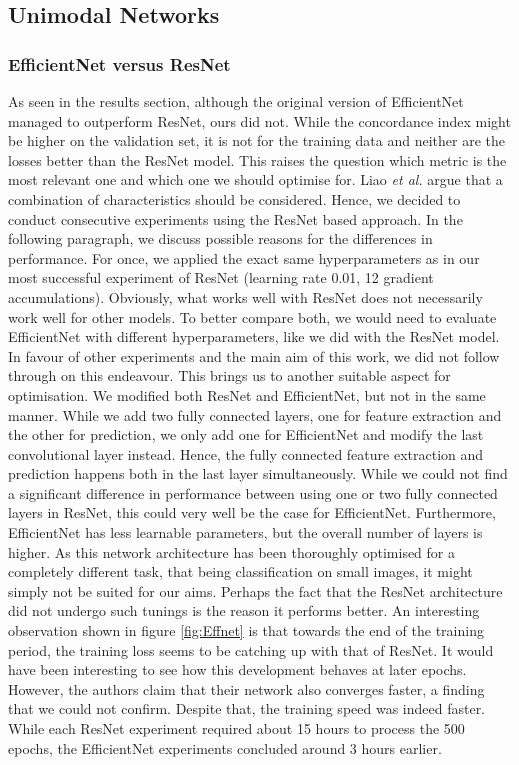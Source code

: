 \subsection{Unimodal Networks}

\subsubsection{EfficientNet versus ResNet} As seen in the results section, although the original version of EfficientNet managed to outperform ResNet, ours did not. While the concordance index might be higher on the validation set, it is not for the training data and neither are the losses better than the ResNet model. This raises the question which metric is the most relevant one and which one we should optimise for. Liao \textit{et al.} argue that a combination of characteristics should be considered. \cite{Liao2022Empirical} Hence, we decided to conduct consecutive experiments using the ResNet based approach. In the following paragraph, we discuss possible reasons for the differences in performance.
For once, we applied the exact same hyperparameters as in our most successful experiment of ResNet (learning rate 0.01, 12 gradient accumulations). Obviously, what works well with ResNet does not necessarily work well for other models. To better compare both, we would need to evaluate EfficientNet with different hyperparameters, like we did with the ResNet model. In favour of other experiments and the main aim of this work, we did not follow through on this endeavour. 
This brings us to another suitable aspect for optimisation. We modified both ResNet and EfficientNet, but not in the same manner. While we add two fully connected layers, one for feature extraction and the other for prediction, we only add one for EfficientNet and modify the last convolutional layer instead. Hence, the fully connected feature extraction and prediction happens both in the last layer simultaneously. While we could not find a significant difference in performance between using one or two fully connected layers in ResNet, this could very well be the case for EfficientNet. Furthermore, EfficientNet has less learnable parameters, but the overall number of layers is higher. As this network architecture has been thoroughly optimised for a completely different task, that being classification on small images, it might simply not be suited for our aims. Perhaps the fact that the ResNet architecture did not undergo such tunings is the reason it performs better. An interesting observation shown in figure \ref{fig:Effnet} is that towards the end of the training period, the training loss seems to be catching up with that of ResNet. It would have been interesting to see how this development behaves at later epochs. However, the authors claim that their network also converges faster, \cite{Tan2021EfficientNetV2} a finding that we could not confirm. Despite that, the training speed was indeed faster. While each ResNet experiment required about 15 hours to process the 500 epochs, the EfficientNet experiments concluded around 3 hours earlier.
